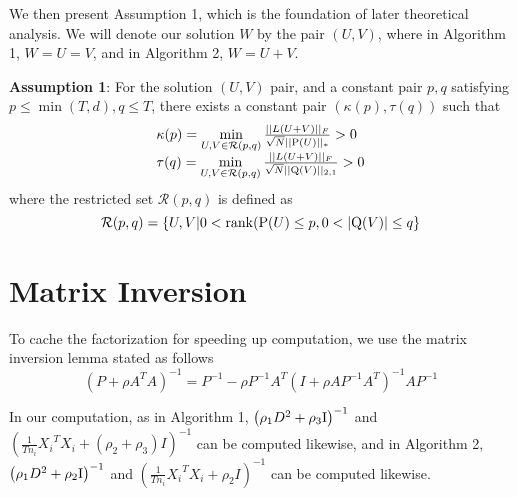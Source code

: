 \documentclass[twoside,leqno,twocolumn]{article}
\begin{document}
We then present Assumption 1, which is the foundation of later
theoretical analysis. We will denote our solution $W$ by the pair $(U,V)$, where in Algorithm 1, $W=U=V$, and in Algorithm 2, $W=U+V$.

\noindent \textbf{Assumption 1}: For the solution $(U,V)$ pair, and a constant pair $p,q$ satisfying $p \le \min \left( {T,d} \right),q \le T$,  there exists a constant pair $(\kappa (p),\tau (q) )$ such that
\begin{equation}
\begin{array}{l}
\kappa (p) = \mathop {\min }\limits_{U,V \in {\cal R}(p,q)} \frac{{||L(U + V)|{|_F}}}{{\sqrt N ||{\rm{P}}(U)|{|_*}}} > 0\\
\tau (q) = \mathop {\min }\limits_{U,V \in {\cal R}(p,q)} \frac{{||L(U + V)|{|_F}}}{{\sqrt N ||{\rm{Q}}(V)|{|_{2,1}}}} > 0
\end{array}
\end{equation}
where the restricted set $\mathcal{R}(p,q)$ is defined as
\begin{equation}
\mathcal{R}(p,q) = \left\{ {U,V|0 < {\rm{rank}}({\rm{P}}(U) \le p,0 < |{\rm{Q}}(V)| \le q} \right\}
\end{equation}

\section{Matrix Inversion}

To cache the factorization for speeding up computation, we use the
matrix inversion lemma stated as follows
\begin{equation}
{(P+\rho{A^{T}}A)^{-1}}={P^{-1}}-\rho{P^{-1}}{A^{T}}{(I+\rho A{P^{-1}}{A^{T}})^{-1}}A{P^{-1}}
\end{equation}


In our computation, as in  Algorithm 1, $\left({{\rho_{1}}{D^{2}}+{\rho_{3}}{\rm {I}}}\right)^{-1}$
and ${\left( {\frac{1}{{T{n_i}}}{X_i}^T{X_i} + ({\rho _2} + {\rho _3})I} \right)^{ - 1}}$ can be
computed likewise, and in Algorithm 2, ${\left({{\rho_{1}}{D^{2}}+{\rho_{2}}{\rm {I}}}\right)^{-1}}$
and ${\left( {\frac{1}{{T{n_i}}}{X_i}^T{X_i} + {\rho _2}I} \right)^{ - 1}}$ can be computed
likewise.
\end{document}
